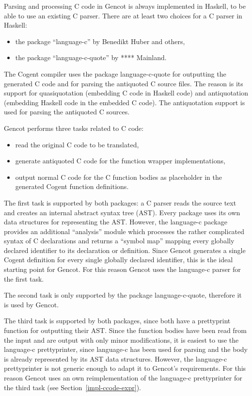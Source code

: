 
Parsing and processing C code in Gencot is always implemented in Haskell, to be able to use an existing
C parser. There are at least two choices for a C parser in Haskell:
\begin{itemize}
\item the package ``language-c'' by Benedikt Huber and others,
\item the package ``language-c-quote'' by **** Mainland.
\end{itemize}

The Cogent compiler uses the package language-c-quote for outputting the generated C code and for parsing the antiquoted
C source files. The reason is its support for quasiquotation (embedding C code in Haskell code) and antiquotation
(embedding Haskell code in the embedded C code). The antiquotation support is used for parsing the antiquoted C sources.

Gencot performs three tasks related to C code:
\begin{itemize}
\item read the original C code to be translated,
\item generate antiquoted C code for the function wrapper implementations,
\item output normal C code for the C function bodies as placeholder in the generated Cogent function definitions.
\end{itemize}

The first task is supported by both packages: a C parser reads the source text and creates an internal abstract syntax tree (AST).
Every package uses its own data structures for representing the AST. However, the language-c package provides an additional
``analysis'' module which processes the rather complicated syntax of C declarations and returns a ``symbol map'' mapping
every globally declared identifier to its declaration or definition. Since Gencot generates a single Cogent definition for
every single globally declared identifier, this is the ideal starting point for Gencot. For this reason Gencot uses
the language-c parser for the first task.

The second task is only supported by the package language-c-quote, therefore it is used by Gencot. 

The third task is supported by both packages, since both have a prettyprint function for outputting their AST. Since the 
function bodies have been read from the input and are output with only minor modifications, it is easiest to use
the language-c prettyprinter, since language-c has been used for parsing and the body is already represented by its 
AST data structures. However, the language-c prettyprinter is not generic enough to adapt it to Gencot's requirements.
For this reason Gencot uses an own reimplementation of the language-c prettyprinter for the third task (see 
Section~\ref{impl-ccode-expr}).

